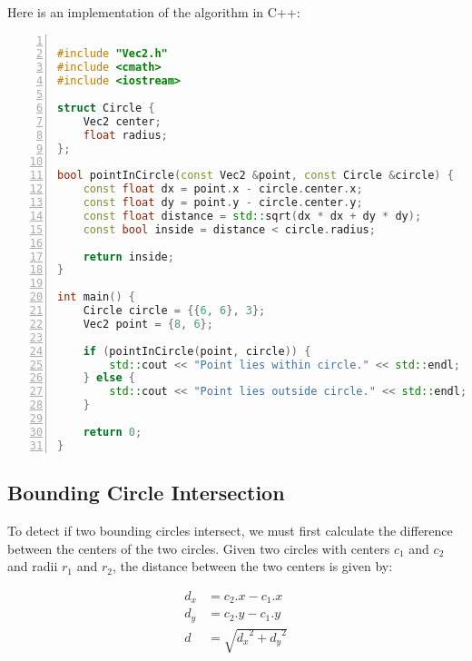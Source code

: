 Here is an implementation of the algorithm in C++: \vspace{1em}
\begin{mdframed}[linecolor=black!30!white,linewidth=.5pt,extratopheight=3em]
    \begin{lstlisting}[language=C++, aboveskip=3mm,
        belowskip=3mm,
        showstringspaces=false,
        columns=flexible,
        basicstyle={\small\ttfamily},
        numbers=left,
        numberstyle=\tiny\color{gray},
        keywordstyle=\color{blue},
        commentstyle=\color{dkgreen},
        stringstyle=\color{mauve},
        breaklines=true,
        breakatwhitespace=true,
        tabsize=3,
        xleftmargin=1em]

#include "Vec2.h"
#include <cmath>
#include <iostream>

struct Circle {
    Vec2 center;
    float radius;
};

bool pointInCircle(const Vec2 &point, const Circle &circle) {
    const float dx = point.x - circle.center.x;
    const float dy = point.y - circle.center.y;
    const float distance = std::sqrt(dx * dx + dy * dy);
    const bool inside = distance < circle.radius;

    return inside;
}

int main() {
    Circle circle = {{6, 6}, 3};
    Vec2 point = {8, 6};

    if (pointInCircle(point, circle)) {
        std::cout << "Point lies within circle." << std::endl;
    } else {
        std::cout << "Point lies outside circle." << std::endl;
    }

    return 0;
}

\end{lstlisting}
\end{mdframed}

\subsection{Bounding Circle Intersection}

To detect if two bounding circles intersect, we must first calculate the
difference between the centers of the two circles. Given two circles with
centers $c_1$ and $c_2$ and radii $r_1$ and $r_2$, the distance between the two
centers is given by:

\begin{equation}
    \begin{aligned}
        d_x & = c_2.x - c_1.x            \\
        d_y & = c_2.y - c_1.y            \\
        d   & = \sqrt{{d_x}^2 + {d_y}^2}
    \end{aligned}
\end{equation}

